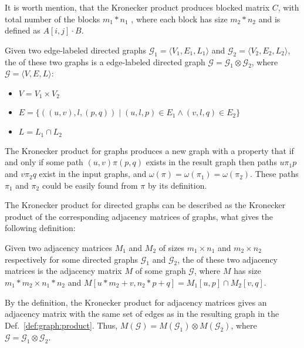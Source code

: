 It is worth mention, that the Kronecker product produces blocked matrix $C$, 
with total number of the blocks $m_1 * n_1$ , where each block has size 
$m_2 * n_2$ and is defined as $A[i,j] \cdot B$.

\begin{definition}
\label{def:graph:product}
Given two edge-labeled directed graphs $\mathcal{G}_1=\langle V_1, E_1, L_1 \rangle$ 
and $\mathcal{G}_2=\langle V_2, E_2, L_2 \rangle$,
the  of these two graphs is a edge-labeled directed graph
$\mathcal{G}=\mathcal{G}_1 \otimes \mathcal{G}_2$, 
where $\mathcal{G}= \langle V, E, L \rangle$:
\begin{itemize}
    \item $V = V_1 \times V_2$
    \item $E = \{((u,v),l,(p,q)) \mid (u,l,p) \in E_1 \wedge (v,l,q) \in E_2 \}$
    \item $L = L_1 \cap L_2$
\end{itemize}
\end{definition}

The Kronecker product for graphs produces a new graph with a property
that if and only if some path $(u,v)\pi(p,q)$ exists in the result graph
then paths $u\pi_1p$ and $v\pi_2q$ exist in the input graphs, 
and $\omega(\pi) = \omega(\pi_1) = \omega(\pi_2)$. 
These paths $\pi_1$ and $\pi_2$ could be easily found from $\pi$ by its definition.

The Kronecker product for directed graphs can be described as 
the Kronecker product of the corresponding adjacency matrices of graphs, 
what gives the following definition:

\begin{definition}
Given two adjacency matrices $M_1$ and $M_2$ of sizes 
$m_1 \times n_1$ and $m_2 \times n_2$ respectively
for some directed graphs $\mathcal{G}_1$ and $\mathcal{G}_2$,
the  of these two adjacency matrices is the adjacency matrix $M$
of some graph $\mathcal{G}$, where $M$ has size $m_1 * m_2 \times n_1 * n_2$ and $M[u * m_2 + v,n_2 * p + q] = M_1[u,p] \cap M_2[v,q]$.
\end{definition}

By the definition, the Kronecker product for adjacency matrices gives an 
adjacency matrix with the same set of edges as in the resulting graph in the
Def.~\ref{def:graph:product}. Thus, $M(\mathcal{G}) = M(\mathcal{G}_1) \otimes
M(\mathcal{G}_2)$, where $\mathcal{G} = \mathcal{G}_1 \otimes \mathcal{G}_2$.

